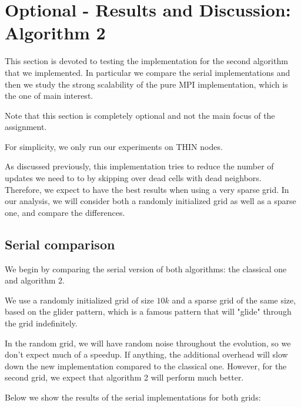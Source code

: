 \documentclass{report}
\begin{document}
\section{Optional - Results and Discussion: Algorithm 2}

This section is devoted to testing the implementation for the second algorithm that 
we implemented. In particular we compare the serial implementations and then 
we study the strong scalability of the pure MPI implementation, which is the one 
of main interest. 

Note that this section is completely optional and not the main focus of the assignment. 

For simplicity, we only run our experiments on THIN nodes. 

As discussed previously, this implementation tries to reduce the number of updates 
we need to to by skipping over dead cells with dead neighbors. Therefore, we expect 
to have the best results when using a very sparse grid. In our analysis, we will 
consider both a randomly initialized grid as well as a sparse one, and compare the 
differences. 

\subsection{Serial comparison}

We begin by comparing the serial version of both algorithms: the classical one 
and algorithm 2. 

We use a randomly initialized grid of size $10k$ and a sparse grid of the same 
size, based on the glider pattern\cite{glider}, which is a famous pattern that 
will "glide" through the grid indefinitely. 

In the random grid, we will have random noise throughout the evolution, so we 
don't expect much of a speedup. If anything, the additional overhead will slow 
down the new implementation compared to the classical one. However, for the 
second grid, we expect that algorithm 2 will perform much better. 

Below we show the results of the serial implementations for both grids:



\printbibliography
\end{document}
